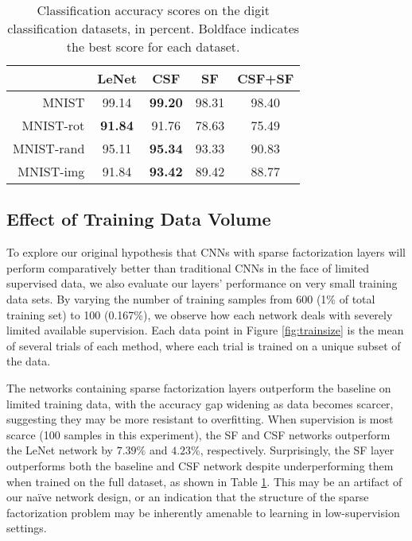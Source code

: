 \documentclass[10pt,twocolumn,letterpaper]{article}
\begin{document}
\begin{table}[]
\centering
\caption{Classification accuracy scores on the digit classification datasets, in percent. Boldface indicates the best score for each dataset.}
\label{tab:results}
\begin{tabular}{|r|c|c|c|c|}
	\hline
	           & LeNet      & CSF        & SF    & CSF+SF \\\hline\hline
	MNIST      & 99.14      & \bf{99.20} & 98.31 & 98.40  \\ \hline
	MNIST-rot  & \bf{91.84} & 91.76      & 78.63 & 75.49  \\ \hline
	MNIST-rand & 95.11      & \bf{95.34} & 93.33 & 90.83  \\ \hline
	MNIST-img  & 91.84      & \bf{93.42} & 89.42 & 88.77  \\ \hline
\end{tabular}
\end{table}

\subsection{Effect of Training Data Volume}

To explore our original hypothesis that CNNs with sparse factorization layers will perform comparatively better than traditional CNNs in the face of limited supervised data, we also evaluate our layers' performance on very small training data sets. By varying the number of training samples from 600 (1\% of total training set) to 100 (0.167\%), we observe how each network deals with severely limited available supervision. Each data point in Figure \ref{fig:trainsize} is the mean of several trials of each method, where each trial is trained on a unique subset of the data.

The networks containing sparse factorization layers outperform the baseline on limited training data, with the accuracy gap widening as data becomes scarcer, suggesting they may be more resistant to overfitting.  When supervision is most scarce (100 samples in this experiment), the SF and CSF networks outperform the LeNet network by $7.39\%$ and $4.23\%$, respectively. 
Surprisingly, the SF layer outperforms both the baseline and CSF network despite underperforming them when trained on the full dataset, as shown in Table \ref{tab:results}. This may be an artifact of our na{\"i}ve network design, or an indication that the structure of the sparse factorization problem may be inherently amenable to learning in low-supervision settings.
\end{document}
